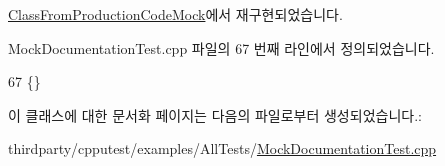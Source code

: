 \hyperlink{class_class_from_production_code_mock_a1c36efc83e945cac88c18e52da55e612}{Class\+From\+Production\+Code\+Mock}에서 재구현되었습니다.



Mock\+Documentation\+Test.\+cpp 파일의 67 번째 라인에서 정의되었습니다.


\begin{DoxyCode}
67 \{\}
\end{DoxyCode}


이 클래스에 대한 문서화 페이지는 다음의 파일로부터 생성되었습니다.\+:\begin{DoxyCompactItemize}
\item 
thirdparty/cpputest/examples/\+All\+Tests/\hyperlink{_mock_documentation_test_8cpp}{Mock\+Documentation\+Test.\+cpp}\end{DoxyCompactItemize}
